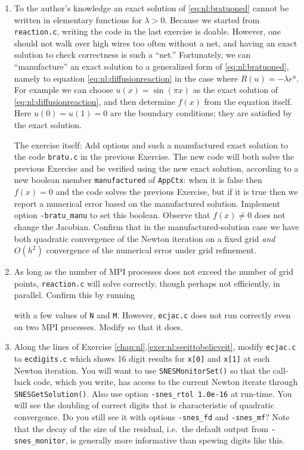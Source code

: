 \begin{enumerate}
\item To the author's knowledge an exact solution of \eqref{eq:nl:bratuoned} cannot be written in elementary functions for $\lambda>0$.  Because we started from \texttt{reaction.c}, writing the code in the last exercise is doable.  However, one should not walk over high wires too often without a net, and having an exact solution to check correctness is such a ``net.''  Fortunately, we can ``manufacture'' \citep{Wesseling2001} an exact solution to a generalized form of \eqref{eq:nl:bratuoned}, namely to equation \eqref{eq:nl:diffusionreaction} in the case where $R(u)=-\lambda e^u$.  For example we can choose $u(x) = \sin(\pi x)$ as the exact solution of \eqref{eq:nl:diffusionreaction}, and then determine $f(x)$ from the equation itself.  Here $u(0)=u(1)=0$ are the boundary conditions; they are satisfied by the exact solution.

The exercise itself: Add options and such a manufactured exact solution to the code \texttt{bratu.c} in the previous Exercise.  The new code will both solve the previous Exercise and be verified using the new exact solution, according to a new boolean member \texttt{manufactured} of \texttt{AppCtx}: when it is false then $f(x)=0$ and the code solves the previous Exercise, but if it is true then we report a numerical error based on the manufactured solution.  Implement option \texttt{-bratu\_manu} to set this boolean.  Observe that $f(x)\ne 0$ does not change the Jacobian.  Confirm that in the manufactured-solution case we have both quadratic convergence of the Newton iteration on a fixed grid \emph{and} $O(h^2)$ convergence of the numerical error under grid refinement.

\item As long as the number of MPI processes does not exceed the number of grid points, \texttt{reaction.c} will solve correctly, though perhaps not efficiently, in parallel.  Confirm this by running
with a few values of \texttt{N} and \texttt{M}.  However, \texttt{ecjac.c} does not run correctly even on two MPI processes.  Modify so that it does.

\item Along the lines of Exercise \ref{chap:nl}.\ref{exer:nl:seeittobelieveit}, modify \texttt{ecjac.c} to \texttt{ecdigits.c} which shows 16 digit results for \texttt{x[0]} and \texttt{x[1]} at each Newton iteration.  You will want to use \texttt{SNESMonitorSet()} so that the call-back code, which you write, has access to the current Newton iterate through \texttt{SNESGetSolution()}.  Also use option \texttt{-snes\_rtol 1.0e-16} at run-time.  You will see the doubling of correct digits that is characteristic of quadratic convergence.  Do you still see it with options \texttt{-snes\_fd} and \texttt{-snes\_mf}?  Note that the decay of the size of the residual, i.e.~the default output from \texttt{-snes\_monitor}, is generally more informative than spewing digits like this.


\end{enumerate}

